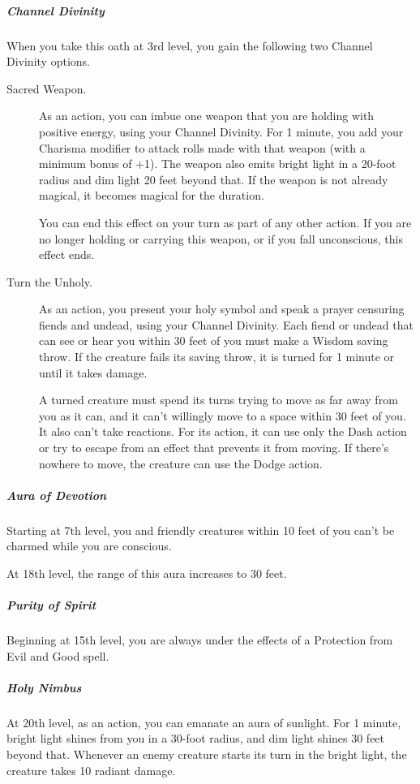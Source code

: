 \subparagraph{Channel Divinity}\label{_channel_divinity}

When you take this oath at 3rd level, you gain the following two Channel
Divinity options.

\begin{description}
\item[Sacred Weapon.]
As an action, you can imbue one weapon that you are holding with
positive energy, using your Channel Divinity. For 1 minute, you add your
Charisma modifier to attack rolls made with that weapon (with a minimum
bonus of +1). The weapon also emits bright light in a 20-foot radius and
dim light 20 feet beyond that. If the weapon is not already magical, it
becomes magical for the duration.

You can end this effect on your turn as part of any other action. If you
are no longer holding or carrying this weapon, or if you fall
unconscious, this effect ends.
\item[Turn the Unholy.]
As an action, you present your holy symbol and speak a prayer censuring
fiends and undead, using your Channel Divinity. Each fiend or undead
that can see or hear you within 30 feet of you must make a Wisdom saving
throw. If the creature fails its saving throw, it is turned for 1 minute
or until it takes damage.

A turned creature must spend its turns trying to move as far away from
you as it can, and it can't willingly move to a space within 30 feet of
you. It also can't take reactions. For its action, it can use only the
Dash action or try to escape from an effect that prevents it from
moving. If there's nowhere to move, the creature can use the Dodge
action.
\end{description}

\subparagraph{Aura of Devotion}\label{_aura_of_devotion}

Starting at 7th level, you and friendly creatures within 10 feet of you
can't be charmed while you are conscious.

At 18th level, the range of this aura increases to 30 feet.

\subparagraph{Purity of Spirit}\label{_purity_of_spirit}

Beginning at 15th level, you are always under the effects of a
Protection from Evil and Good spell.

\subparagraph{Holy Nimbus}\label{_holy_nimbus}

At 20th level, as an action, you can emanate an aura of sunlight. For 1
minute, bright light shines from you in a 30-foot radius, and dim light
shines 30 feet beyond that. Whenever an enemy creature starts its turn
in the bright light, the creature takes 10 radiant damage.

